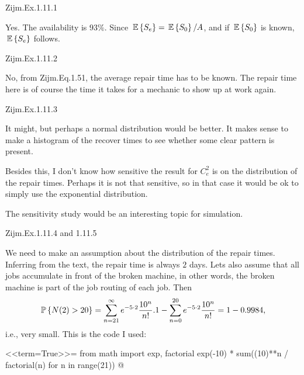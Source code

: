 \begin{question}
Zijm.Ex.1.11.1
 \begin{solution}
Yes. The availability is $93\%$. Since $\E{S_e} = \E{S_0}/A$, and if $\E{S_0} $ is known, $\E{S_e}$ follows.
\end{solution}
\end{question}

\begin{question}
Zijm.Ex.1.11.2
 \begin{solution}
   No, from Zijm.Eq.1.51, the average repair time has to be known. The
   repair time here is of course the time it takes for a mechanic to
   show up at work again.
\end{solution}
\end{question}
\begin{question}
Zijm.Ex.1.11.3
 \begin{solution}
   It might, but perhaps a normal distribution would be better. It
   makes sense to make a histogram of the recover times to see whether
   some clear pattern is present. 

   Besides this, I don't know how sensitive the result for $C_e^2$ is
   on the distribution of the repair times. Perhaps it is not that
   sensitive, so in that case it would be ok to simply use the
   exponential distribution. 

The sensitivity study would be an interesting topic for simulation. 
\end{solution}
\end{question}
\begin{question}
Zijm.Ex.1.11.4 and 1.11.5
 \begin{solution}
   We need to make an assumption about the distribution of the repair
   times. Inferring from the text, the repair time is always $2$
   days. Lets also assume that all jobs accumulate in front of the
   broken machine, in other words, the broken machine is part of the
   job routing of each job. Then
   \begin{equation*}
     \P{N(2) > 20} = 
\sum_{n=21}^\infty e^{-5\cdot 2} \frac{10^n}{n!}.
1  - \sum_{n=0}^{20} e^{-5\cdot 2} \frac{10^n}{n!} = 1-0.9984,
   \end{equation*}
i.e., very small.  This is the code I used: 

<<term=True>>=
from math import exp, factorial
exp(-10) * sum((10)**n / factorial(n) for n in range(21))
@
\end{solution}
\end{question}

